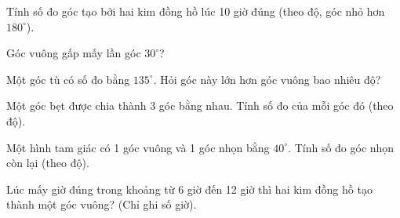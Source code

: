 \begin{ex} %
Tính số đo góc tạo bởi hai kim đồng hồ lúc 10 giờ đúng (theo độ, góc nhỏ hơn $180^\circ$).
\end{ex}

\begin{ex} %
Góc vuông gấp mấy lần góc $30^\circ$?
\end{ex}

\begin{ex} %
Một góc tù có số đo bằng $135^\circ$. Hỏi góc này lớn hơn góc vuông bao nhiêu độ?
\end{ex}

\begin{ex} %
Một góc bẹt được chia thành 3 góc bằng nhau. Tính số đo của mỗi góc đó (theo độ).
\end{ex}

\begin{ex} %
Một hình tam giác có 1 góc vuông và 1 góc nhọn bằng $40^\circ$. Tính số đo góc nhọn còn lại (theo độ).
\end{ex}

\begin{ex} %
Lúc mấy giờ đúng trong khoảng từ 6 giờ đến 12 giờ thì hai kim đồng hồ tạo thành một góc vuông? (Chỉ ghi số giờ).
\end{ex}
